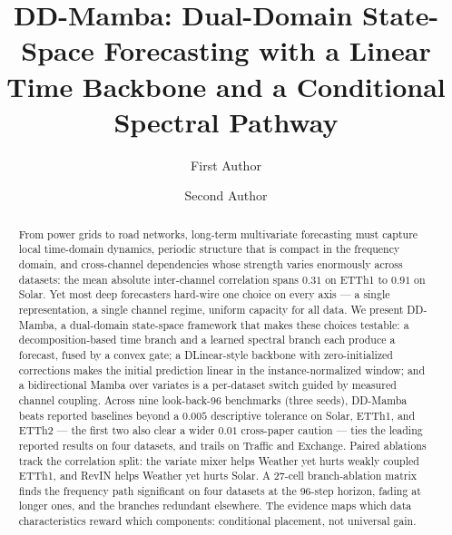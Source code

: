 \documentclass[runningheads]{llncs}
\newcommand{\model}{DD-Mamba}
\newif\ifanonymous
\begin{document}
\title{\model{}: Dual-Domain State-Space Forecasting with a Linear Time
Backbone and a Conditional Spectral Pathway}

\ifanonymous
\author{Anonymous Submission}
\authorrunning{Anonymous Submission}
\institute{ADMA 2026 double-blind review}
\else
\author{First Author \and
Second Author}
\fi

\maketitle

\begin{abstract}
From power grids to road networks, long-term multivariate forecasting must
capture local time-domain dynamics, periodic structure that is compact in
the frequency domain, and cross-channel dependencies whose strength varies
enormously across datasets: the mean absolute inter-channel correlation
spans $0.31$ on ETTh1 to $0.91$ on Solar. Yet most deep forecasters
hard-wire one choice on every axis --- a single representation, a single
channel regime, uniform capacity for all data. We present \model{}, a
dual-domain state-space framework that makes these choices testable: a
decomposition-based time branch and a learned spectral branch each produce
a forecast, fused by a convex gate; a DLinear-style backbone with
zero-initialized corrections makes the initial prediction linear in the
instance-normalized window; and a bidirectional Mamba over variates is a
per-dataset switch guided by measured channel coupling. Across nine
look-back-96 benchmarks (three seeds), \model{} beats reported baselines
beyond a $0.005$ descriptive tolerance on Solar, ETTh1, and ETTh2 --- the
first two also clear a wider $0.01$ cross-paper caution --- ties the
leading reported results on four datasets, and trails on Traffic and
Exchange. Paired ablations track the correlation split: the variate mixer
helps Weather yet hurts weakly coupled ETTh1, and RevIN helps Weather yet
hurts Solar. A 27-cell branch-ablation matrix finds the frequency path
significant on four datasets at the 96-step horizon, fading at longer
ones, and the branches redundant elsewhere. The evidence maps which data
characteristics reward which components: conditional placement, not
universal gain.
\end{abstract}
\end{document}
